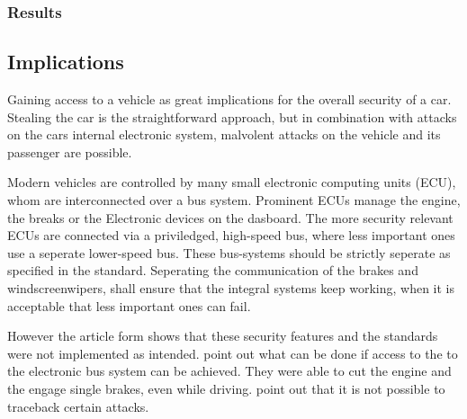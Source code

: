 \subsubsection*{Results}

\subsection*{Implications}
\label{sec:attackImplications}
Gaining access to a vehicle as great implications for the overall security of a car.
Stealing the car is the straightforward approach,
but in combination with attacks on the cars internal electronic system,
malvolent attacks on the vehicle and its passenger are possible.

Modern vehicles are controlled by many small electronic computing units (ECU),
whom are interconnected over a bus system.
Prominent ECUs manage the engine, the breaks or the Electronic devices on the dasboard.
The more security relevant ECUs are connected via a priviledged,
high-speed bus,
where less important ones use a seperate lower-speed bus.
These bus-systems should be strictly seperate as specified in the standard. %
Seperating the communication of the brakes and windscreenwipers,
shall ensure that the integral systems keep working,
when it is acceptable that less important ones can fail.

However the article form %
shows that these security features and the standards were not implemented as intended.
point out what can be done if access to the to the electronic bus system can be achieved.
They were able to cut the engine and the engage single brakes,
even while driving.
point out that it is not possible to traceback certain attacks.	%

